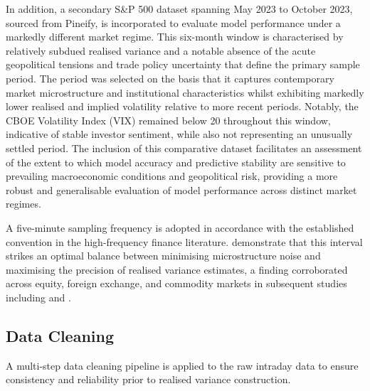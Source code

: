 In addition, a secondary S\&P 500 dataset spanning May 2023 to October 2023, sourced from Pineify, is incorporated to evaluate model performance under a markedly different market regime. This six-month window is characterised by relatively subdued realised variance and a notable absence of the acute geopolitical tensions and trade policy uncertainty that define the primary sample period. The period was selected on the basis that it captures contemporary market microstructure and institutional characteristics whilst exhibiting markedly lower realised and implied volatility relative to more recent periods. Notably, the CBOE Volatility Index (VIX) remained below 20 throughout this window, indicative of stable investor sentiment, while also not representing an unusually settled period. The inclusion of this comparative dataset facilitates an assessment of the extent to which model accuracy and predictive stability are sensitive to prevailing macroeconomic conditions and geopolitical risk, providing a more robust and generalisable evaluation of model performance across distinct market regimes.


A five-minute sampling frequency is adopted in accordance with the established convention in the high-frequency finance literature. \cite{LiuPattonSheppard2015} demonstrate that this interval strikes an optimal balance between minimising microstructure noise and maximising the precision of realised variance estimates, a finding corroborated across equity, foreign exchange, and commodity markets in subsequent studies including \cite{PlihalLyocsa2021} and \cite{KambouroudisMcMillanTsakou2021}.

\subsection{Data Cleaning}

A multi-step data cleaning pipeline is applied to the raw intraday data to ensure consistency and reliability prior to realised variance construction.


